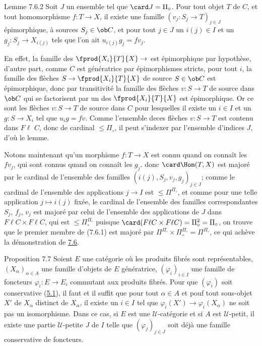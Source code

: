 \begin{enonce*}{Lemme 7.6.2}
Soit $J$ un ensemble tel que $\card J=\Pi_\circ$. Pour tout objet
$T$ de $C$, et tout homomorphisme $f:T\rightarrow X$, il existe une
famille $(v_j:S_j\rightarrow T)_{j\in J}$ épimorphique, à sources
$S_j\in\ob C$, et pour tout $j\in J$ un $i(j)\in I$ et un
$g_j:S_j\rightarrow X_{i(j)}$ tels que l'on ait $u_{i(j)}g_j=fv_j$.
\end{enonce*}

En effet, la famille des $\fprod{X_i}{T}{X}\rightarrow$ est
épimorphique par hypothèse, d'autre part, comme $C$ est
génératrice
par épimorphismes stricts, pour tout $i$, la famille des flèches
$S\rightarrow \fprod{X_i}{T}{X}$ de source $S\in \ob C$ est
épimorphique, donc par transitivité la famille des flèches
$v:S\rightarrow T$ de source dans $\ob C$ qui se factorisent par un
des $\fprod{X_i}{T}{X}$ est épimorphique. Or ce sont les flèches
$v:S\rightarrow T$ de source dans $C$ pour lesquelles il existe un
$i\in I$ et un $g:S\rightarrow X_i$ tel que $u_ig=fv$. Comme
l'ensemble de\pageoriginale ces flèches $v:S\rightarrow T$ est
contenu dans $F\ell$ $C$, donc de cardinal $\leq \Pi_\circ$, il peut
s'indexer par l'ensemble d'indices $J$, d'où le lemme.

Notons maintenant qu'un morphisme $f:T\rightarrow X$ est connu quand
on connaît les $fv_j$, qui sont connus quand on connaît les $g_j$.
donc $\card\Hom(T,X)$ est majoré par le cardinal de l'ensemble des
familles $(i(j),S_j,v_j,g_j)_{j\in J}$; comme le cardinal de
l'ensemble des applications $j\rightarrow I$ est $\leq
\Pi^{\Pi_\circ}$, et comme pour une telle application $j\mapsto
i(j)$ fixée, le cardinal de l'ensemble des familles correspondantes
$S_j$, $f_j$, $v_j$ est majoré par celui de l'ensemble des
applications de $J$ dans $F\ell  C\times F\ell  C$, qui est $\leq
\Pi^{\Pi_\circ}_\circ$ puisque $\card(F\ell C\times F\ell
C)=\Pi_\circ^2=\Pi_\circ$, on trouve que le premier membre de
(7.6.1) est majoré par $\Pi^{\Pi_\circ}\times
\Pi_\circ^{\Pi_\circ}=\Pi^{\Pi_\circ}$, ce qui achève la
démonstration de \hyperref[I.prop7.6]{7.6}.

\begin{enonce*}{Proposition 7.7}
Soient $E$ une catégorie où les produits fibrés sont représentables,
$(X_\alpha)_{\alpha\in A}$ une famille d'objets de $E$ génératrice,
$(\varphi_i)_{i\in I}$ une famille de foncteurs
$\varphi_i:E\rightarrow E_i$ commutant aux produits fibrés. Pour que
$(\varphi_i)$ soit conservative (\hyperref[I.prop5.1]{5.1}), il faut et il
suffit que pour tout $\alpha \in A$ et pouf tout sous-objet $X'$ de
$X_\alpha$ distinct de $X_\alpha$, il existe un $i\in I$ tel que
$\varphi_i(X')\rightarrow \varphi_i(X_\alpha)$ ne soit pas un
isomorphisme. Dans ce cas, si $E$ est une $𝒰$-catégorie et
si $A$ est $𝒰$-petit, il existe une partie
$𝒰$-petite $J$ de $I$ telle que $(\varphi_j)_{j\in J}$ soit
déjà une famille conservative de foncteurs.
\end{enonce*}

